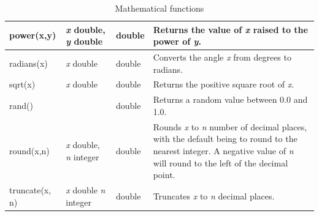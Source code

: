 \documentclass[11pt,a4paper]{ivoa}
\begin{document}
\begin{table}[thm]
\begin{tabular}{|p{}|p{}|p{}|p{}|}
        \hline
        power(x,y) &
        \textit{x} double,
        \newline
        \textit{y} double &
        double &
        Returns the value of \textit{x} raised to the power of \textit{y}.
        \tabularnewline

        \hline
        radians(x) &
        \textit{x} double &
        double &
        Converts the angle \textit{x} from degrees to radians.
        \tabularnewline

        \hline
        sqrt(x) &
        \textit{x} double &
        double &
        Returns the positive square root of \textit{x}.
        \tabularnewline

        \hline
        rand() &
        &
        double &
        Returns a random value between 0.0 and 1.0.
        \tabularnewline

        \hline
        round(x,n) &
        \textit{x} double,
        \newline
        \textit{n} integer &
        double &
        Rounds \textit{x} to \textit{n} number of decimal places, with the default being to round to the nearest integer.
        A negative value of \textit{n} will round to the left of the decimal point.
        \tabularnewline

        \hline
        truncate(x, n) &
        \textit{x} double
        \newline
        \textit{n} integer &
        double &
        Truncates \textit{x} to \textit{n} decimal places.
        \tabularnewline

        \hline
    \end{tabular}
    \caption{Mathematical functions}
    \label{table:math.functions}
\end{table}
\end{document}
